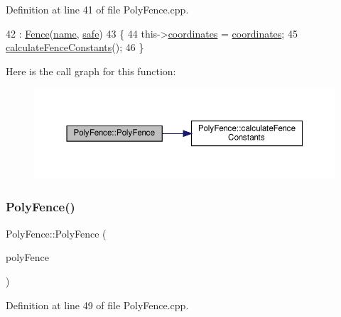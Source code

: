 Definition at line 41 of file Poly\+Fence.\+cpp.


\begin{DoxyCode}
42         : \hyperlink{class_fence_a5c2be718e885ed9ae2ca048406d126b3}{Fence}(\hyperlink{class_fence_aa405676733f25812b38ea0dd9ccd1863}{name}, \hyperlink{class_fence_ad570430040eee657c625a67d5589c4b5}{safe})
43 \{
44     this->\hyperlink{class_poly_fence_ae8e0c55e745979cab104ef80aeb4b418}{coordinates} = \hyperlink{class_poly_fence_ae8e0c55e745979cab104ef80aeb4b418}{coordinates};
45     \hyperlink{class_poly_fence_a229de6f5987bf7d312310b522db0d5a4}{calculateFenceConstants}();
46 \}
\end{DoxyCode}
Here is the call graph for this function\+:
\nopagebreak
\begin{figure}[H]
\begin{center}
\leavevmode
\includegraphics[width=350pt]{d1/d22/class_poly_fence_a8468093f83237de375992d099727b93d_cgraph}
\end{center}
\end{figure}
\mbox{\label{class_poly_fence_ad95391c8cf7de0e39cb704cfe771101e}} 
\subsubsection{\texorpdfstring{Poly\+Fence()}{PolyFence()}\hspace{0.1cm}{\footnotesize\ttfamily [3/3]}}
{\footnotesize\ttfamily Poly\+Fence\+::\+Poly\+Fence (\begin{DoxyParamCaption}\item[{const \hyperlink{class_poly_fence}{Poly\+Fence} \&}]{poly\+Fence }\end{DoxyParamCaption})}



Definition at line 49 of file Poly\+Fence.\+cpp.


